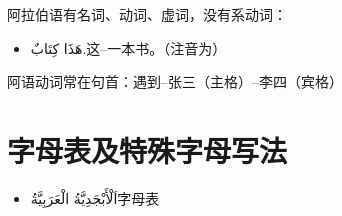 阿拉伯语有名词、动词、虚词，没有系动词：

\begin{itemize}
    \item \ac{هَذَا كِتَابٌ.}{这--一本书。（注音为）}
\end{itemize}

阿语动词常在句首：遇到--张三（主格）--李四（宾格）

\section{字母表及特殊字母写法}

\begin{itemize}
    \item \ac{اَلْأَبْجَدِيَّةُ الْعَرَبِيَّةُ}{字母表}
\end{itemize}

